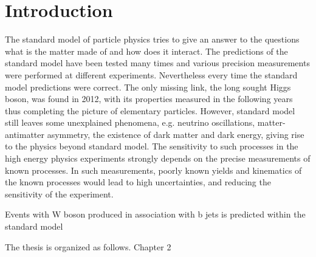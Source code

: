 
\chapter{Introduction} %

\label{Chapter1} %


The standard model of particle physics tries to give an answer to the questions what is the matter made of and how does it interact. The predictions of the standard model have been tested many times and various precision measurements were performed at different experiments. Nevertheless every time the standard model predictions were correct. The only missing link, the long sought Higgs boson, was found in 2012, with its properties measured in the following years thus completing the picture of elementary particles. However, standard model still leaves some unexplained phenomena, e.g. neutrino oscillations, matter-antimatter asymmetry, the existence of dark matter and dark energy, giving rise to the physics beyond standard model. The sensitivity to such processes in the high energy physics experiments strongly depends on the precise measurements of known processes. In such measurements, poorly known yields and kinematics of the known processes would lead to high uncertainties, and reducing the sensitivity of the experiment. 
\par Events with W boson produced in association with b jets is predicted within the standard model


The thesis is organized as follows. Chapter 2
